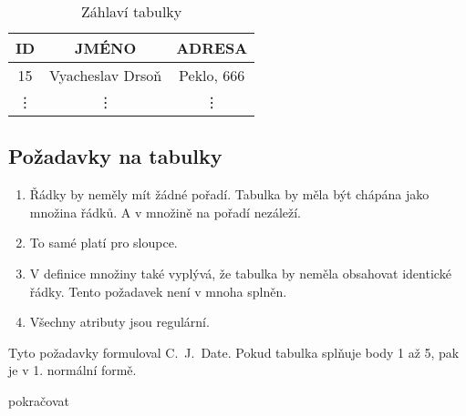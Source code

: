 \begin{table}
\caption{Záhlaví tabulky}\label{tab:zahlavi}
\begin{center}
\begin{tabular}{|c|c|c|}
\hline
ID & JMÉNO & ADRESA \\
\hline
15 & Vyacheslav Drsoň & Peklo, 666 \\
\hline
\vdots & \vdots & \vdots \\
\hline
\end{tabular}
\end{center}
\end{table}

\subsection{Požadavky na tabulky}
\begin{enumerate}
\item Řádky by neměly mít žádné pořadí. Tabulka by měla být chápána jako množina řádků. A v množině na pořadí nezáleží.
\item To samé platí pro sloupce.
\item V definice množiny také vyplývá, že tabulka by neměla obsahovat identické řádky. Tento požadavek není v mnoha  splněn.
\item Všechny atributy jsou regulární.
\end{enumerate}
Tyto požadavky formuloval C.~J.~Date.
Pokud tabulka splňuje body 1 až 5, pak je v 1. normální formě.

pokračovat
